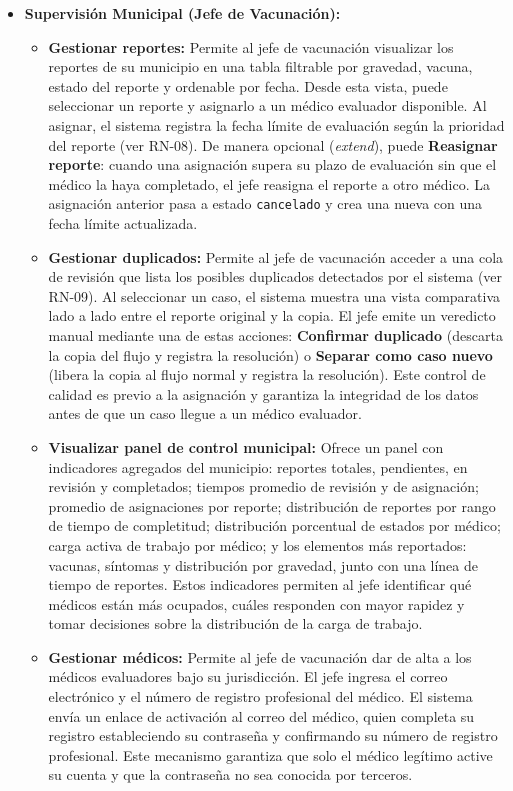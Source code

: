 \documentclass[12pt,letterpaper]{article}
\begin{document}
\begin{itemize}
\item \textbf{Supervisión Municipal (Jefe de Vacunación):}
\begin{itemize}
\item \textbf{Gestionar reportes:} Permite al jefe de vacunación visualizar los reportes de su municipio en una tabla filtrable por gravedad, vacuna, estado del reporte y ordenable por fecha. Desde esta vista, puede seleccionar un reporte y asignarlo a un médico evaluador disponible. Al asignar, el sistema registra la fecha límite de evaluación según la prioridad del reporte (ver RN-08). De manera opcional (\textit{extend}), puede \textbf{Reasignar reporte}: cuando una asignación supera su plazo de evaluación sin que el médico la haya completado, el jefe reasigna el reporte a otro médico. La asignación anterior pasa a estado \texttt{cancelado} y crea una nueva con una fecha límite actualizada.
\item \textbf{Gestionar duplicados:} Permite al jefe de vacunación acceder a una cola de revisión que lista los posibles duplicados detectados por el sistema (ver RN-09). Al seleccionar un caso, el sistema muestra una vista comparativa lado a lado entre el reporte original y la copia. El jefe emite un veredicto manual mediante una de estas acciones: \textbf{Confirmar duplicado} (descarta la copia del flujo y registra la resolución) o \textbf{Separar como caso nuevo} (libera la copia al flujo normal y registra la resolución). Este control de calidad es previo a la asignación y garantiza la integridad de los datos antes de que un caso llegue a un médico evaluador.
\item \textbf{Visualizar panel de control municipal:} Ofrece un panel con indicadores agregados del municipio: reportes totales, pendientes, en revisión y completados; tiempos promedio de revisión y de asignación; promedio de asignaciones por reporte; distribución de reportes por rango de tiempo de completitud; distribución porcentual de estados por médico; carga activa de trabajo por médico; y los elementos más reportados: vacunas, síntomas y distribución por gravedad, junto con una línea de tiempo de reportes. Estos indicadores permiten al jefe identificar qué médicos están más ocupados, cuáles responden con mayor rapidez y tomar decisiones sobre la distribución de la carga de trabajo.
\item \textbf{Gestionar médicos:} Permite al jefe de vacunación dar de alta a los médicos evaluadores bajo su jurisdicción. El jefe ingresa el correo electrónico y el número de registro profesional del médico. El sistema envía un enlace de activación al correo del médico, quien completa su registro estableciendo su contraseña y confirmando su número de registro profesional. Este mecanismo garantiza que solo el médico legítimo active su cuenta y que la contraseña no sea conocida por terceros.
\end{itemize}


\end{itemize}
\end{document}
